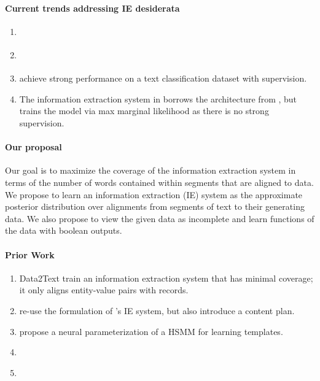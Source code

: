 \documentclass[11pt]{article}
\begin{document}
\paragraph{Current trends addressing IE desiderata}
\begin{enumerate}
\item \citet{snyder2007d2t}
\item \citet{liang2009semalign}
\item \citet{dossantos2015classification} achieve strong performance on
a text classification dataset with supervision.
\item The information extraction system in \citet{wiseman2017d2t}
borrows the architecture from \citet{dossantos2015classification},
but trains the model via max marginal likelihood as there is
no strong supervision.
\end{enumerate}

\paragraph{Our proposal}
Our goal is to maximize the coverage of the information extraction system
in terms of the number of words contained within segments that are aligned to data.
We propose to learn an information extraction (IE) system as the approximate posterior distribution over 
alignments from segments of text to their generating data.
We also propose to view the given data as incomplete and learn functions of the data
with boolean outputs.

\paragraph{Prior Work}
\begin{enumerate}
\item Data2Text \citet{wiseman2017d2t} train an information extraction system
that has minimal coverage; it only aligns entity-value pairs with records.
\item \citet{puduppully2018contentselection} re-use the formulation of \citet{wiseman2017d2t}'s IE 
system, but also introduce a content plan.
\item \citet{wiseman2018template} propose a neural parameterization of a HSMM for learning templates.
\item \citet{liang2009semalign}
\item \citet{sauper2009wiki}
\end{enumerate}
\end{document}
